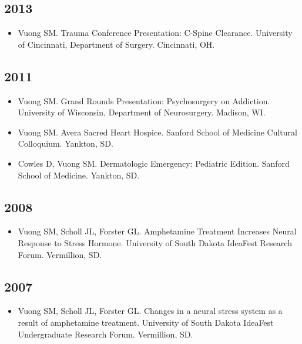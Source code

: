 \documentclass[11pt, a4paper]{article}
\begin{document}
\subsection{2013}
\begin{itemize}
  \setlength\itemindent{0.25em}
  \item Vuong SM. Trauma Conference Presentation: C-Spine Clearance. University of Cincinnati, Department of Surgery. Cincinnati, OH.
\end{itemize}

\subsection{2011}
\begin{itemize}
  \setlength\itemindent{0.25em}
  \item Vuong SM. Grand Rounds Presentation: Psychosurgery on Addiction. University of Wisconsin, Department of Neurosurgery. Madison, WI.
  \item Vuong SM. Avera Sacred Heart Hospice. Sanford School of Medicine Cultural Colloquium. Yankton, SD.
  \item Cowles D, Vuong SM. Dermatologic Emergency: Pediatric Edition. Sanford School of Medicine. Yankton, SD.
\end{itemize}

\subsection{2008}
\begin{itemize}
  \setlength\itemindent{0.25em}
  \item Vuong SM, Scholl JL, Forster GL. Amphetamine Treatment Increases Neural Response to Stress Hormone. University of South Dakota IdeaFest Research Forum. Vermillion, SD.
\end{itemize}

\subsection{2007}
\begin{itemize}
  \setlength\itemindent{0.25em}
  \item Vuong SM, Scholl JL, Forster GL. Changes in a neural stress system as a result of amphetamine treatment. University of South Dakota IdeaFest Undergraduate Research Forum. Vermillion, SD.
\end{itemize}
\end{document}
